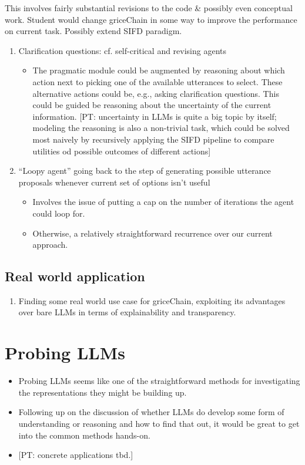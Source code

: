 \documentclass[fleqn,reqno,10pt]{article}
\newcommand{\pt}[1]{\textcolor{CSP-accent-1}{[PT: #1]}}
\begin{document}
This involves fairly substantial revisions to the code \& possibly even conceptual work.  Student would change griceChain in some way to improve the performance on current task. Possibly extend SIFD paradigm.

\begin{enumerate}
  \item Clarification questions: cf. self-critical and revising agents
  \begin{itemize}
    \item The pragmatic module could be augmented by reasoning about which action next to picking one of the available utterances to select. These alternative actions could be, e.g., asking clarification questions. This could be guided be reasoning about the uncertainty of the current information. \pt{uncertainty in LLMs is quite a big topic by itself; modeling the reasoning is also a non-trivial task, which could be solved most naively by recursively applying the SIFD pipeline to compare utilities od possible outcomes of different actions}
  \end{itemize}
  \item ``Loopy agent'' going back to the step of generating possible utterance proposals whenever current set of options isn't useful
  \begin{itemize}
    \item Involves the issue of putting a cap on the number of iterations the agent could loop for.
    \item Otherwise, a relatively straightforward recurrence over our current approach.
  \end{itemize}
\end{enumerate}

\subsection{Real world application}

\begin{enumerate}
  \item Finding some real world use case for griceChain, exploiting its advantages over bare LLMs in terms of explainability and transparency.
\end{enumerate}

\section{Probing LLMs}
\begin{itemize}
  \item Probing LLMs seems like one of the straightforward methods for investigating the representations they might be building up.
  \item Following up on the discussion of whether LLMs do develop some form of understanding or reasoning and how to find that out, it would be great to get into the common methods hands-on.
  \item \pt{concrete applications tbd.}
\end{itemize}
\end{document}
